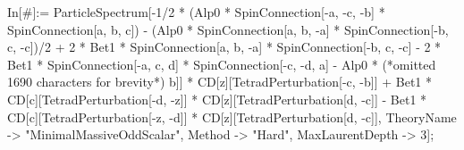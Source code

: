 In[#]:= ParticleSpectrum[-1/2 * (Alp0 * SpinConnection[-a, -c, -b] * SpinConnection[a, b, c]) - (Alp0 * SpinConnection[a, b, -a] * SpinConnection[-b, c, -c])/2 + 2 * Bet1 * SpinConnection[a, b, -a] * SpinConnection[-b, c, -c] - 2 * Bet1 * SpinConnection[-a, c, d] * SpinConnection[-c, -d, a] - Alp0 * (*omitted 1690 characters for brevity*) b]] * CD[z][TetradPerturbation[-c, -b]] + Bet1 * CD[c][TetradPerturbation[-d, -z]] * CD[z][TetradPerturbation[d, -c]] - Bet1 * CD[c][TetradPerturbation[-z, -d]] * CD[z][TetradPerturbation[d, -c]], TheoryName -> "MinimalMassiveOddScalar", Method -> "Hard", MaxLaurentDepth -> 3];